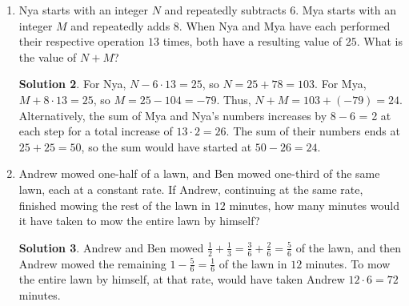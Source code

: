 \documentclass{article}
\theoremstyle{definition}
\newtheorem*{solution}{Solution}
\begin{document}
\begin{multicols}{2}
\begin{enumerate}
\begin{solution}
                Since we are told that the digits of his age are different and his age is not prime, that rules out $44$ and $53$ as possible ages.
                So, we conclude that Marco is $35$ years old.
            \end{solution}
        \item Nya starts with an integer $N$ and repeatedly subtracts $6$.
            Mya starts with an integer $M$ and repeatedly adds $8$.
            When Nya and Mya have each performed their respective operation $13$ times, both have a resulting value of $25$.
            What is the value of $N + M$?
            \begin{solution}
                For Nya, $N - 6 \cdot 13 = 25$, so $N = 25 + 78 = 103$.
                For Mya, $M + 8 \cdot 13 = 25$, so $M = 25 - 104 = -79$.
                Thus, $N + M = 103 + (-79) = 24$.
                Alternatively, the sum of Mya and Nya's numbers increases by $8 - 6$ = 2 at each step for a total increase of $13 \cdot 2 = 26$.
                The sum of their numbers ends at $25 + 25 = 50$, so the sum would have started at $50 - 26 = 24$.
            \end{solution}
        \item Andrew mowed one-half of a lawn, and Ben mowed one-third of the same lawn, each at a constant rate.
            If Andrew, continuing at the same rate, finished mowing the rest of the lawn in $12$ minutes, how many minutes would it have taken to mow the entire lawn by himself?
            \begin{solution}
                Andrew and Ben mowed $\frac{1}{2} + \frac{1}{3} = \frac{3}{6} + \frac{2}{6} = \frac{5}{6}$ of the lawn, and then Andrew mowed the remaining $1 - \frac{5}{6} = \frac{1}{6}$ of the lawn in $12$ minutes.
                To mow the entire lawn by himself, at that rate, would have taken Andrew $12 \cdot 6 = 72$ minutes.
            \end{solution}
    \end{enumerate}
\end{multicols}
\end{document}
